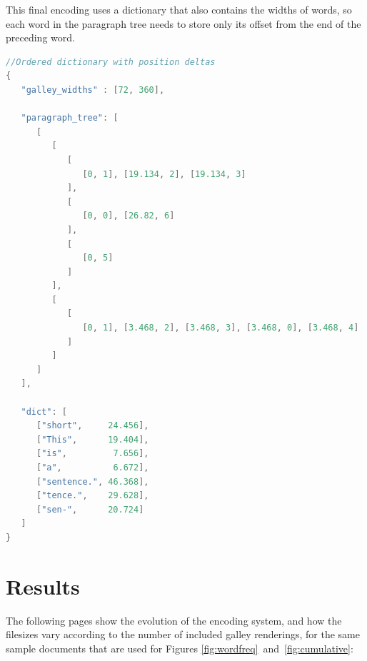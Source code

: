 \clearpage

This final encoding uses a dictionary that also contains the widths of words, so each word in the paragraph tree needs to store only its offset from the end of the preceding word.

\vspace{0.5in}
\begin{lstlisting}[language=c,stringstyle=\color{blue},basicstyle=\ttfamily\footnotesize\singlespacing]
//Ordered dictionary with position deltas
{
   "galley_widths" : [72, 360],

   "paragraph_tree": [
      [
         [
            [
               [0, 1], [19.134, 2], [19.134, 3]
            ],
            [
               [0, 0], [26.82, 6]
            ],
            [
               [0, 5]
            ]
         ],
         [
            [
               [0, 1], [3.468, 2], [3.468, 3], [3.468, 0], [3.468, 4]
            ]
         ]
      ]
   ],

   "dict": [
      ["short",     24.456],
      ["This",      19.404],
      ["is",         7.656],
      ["a",          6.672],
      ["sentence.", 46.368],
      ["tence.",    29.628],
      ["sen-",      20.724]
   ]
}
\end{lstlisting}


\clearpage
\section{Results}

The following pages show the evolution of the encoding system, and how the filesizes vary according to the number of included \gls{galley} renderings, for the same sample documents that are used for Figures \ref{fig:wordfreq}~and~\ref{fig:cumulative}:

